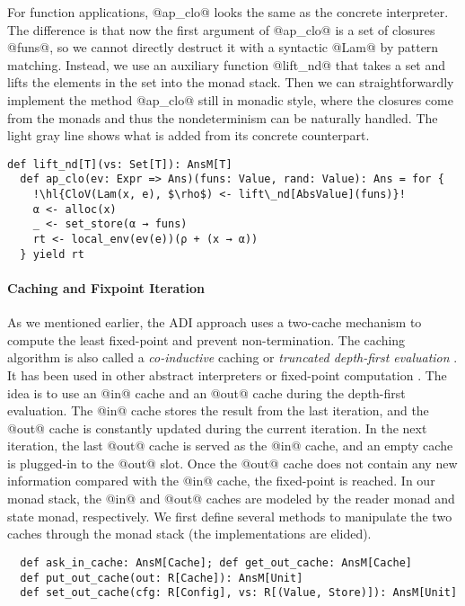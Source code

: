 For function applications, @ap_clo@ looks the same as the concrete interpreter.
The difference is that now the first argument of @ap_clo@ is a set of closures
@funs@, so we cannot directly destruct it with a syntactic @Lam@ by pattern
matching. Instead, we use an auxiliary function @lift_nd@ that takes a set and
lifts the elements in the set into the monad stack. Then we can
straightforwardly implement the method @ap_clo@ still in monadic style, where the
closures come from the monads and thus the nondeterminism can be naturally
handled. The light gray line shows what is added from its concrete counterpart.
\begin{lstlisting}[escapechar=!]
  def lift_nd[T](vs: Set[T]): AnsM[T]
  def ap_clo(ev: Expr => Ans)(funs: Value, rand: Value): Ans = for {
    !\hl{CloV(Lam(x, e), $\rho$) <- lift\_nd[AbsValue](funs)}!
    α <- alloc(x)
    _ <- set_store(α → funs)
    rt <- local_env(ev(e))(ρ + (x → α))
  } yield rt
\end{lstlisting}

\paragraph{Caching and Fixpoint Iteration}
As we mentioned earlier, the ADI approach uses a two-cache mechanism to
compute the least fixed-point and prevent non-termination.
The caching algorithm is also called a \textit{co-inductive} caching or
\textit{truncated depth-first evaluation} \cite{Rosendahl:AbsIntPL}. It has
been used in other abstract interpreters or fixed-point computation
\cite{DBLP:journals/pacmpl/DaraisLNH17, Wei:2018:RAA:3243631.3236800,
  Rosendahl:AbsIntPL}. The idea is to use an @in@ cache and an @out@ cache during
the depth-first evaluation. The @in@ cache stores the result from the last
iteration, and the @out@ cache is constantly updated during the current iteration. In
the next iteration, the last @out@ cache is served as the @in@ cache, and
an empty cache is plugged-in to the @out@ slot. Once the @out@ cache does not
contain any new information compared with the @in@ cache, the fixed-point is
reached.
In our monad stack, the @in@ and @out@ caches are modeled by the reader monad and
state monad, respectively. We first define several methods to manipulate
the two caches through the monad stack (the implementations are elided).
\begin{lstlisting}
  def ask_in_cache: AnsM[Cache]; def get_out_cache: AnsM[Cache]
  def put_out_cache(out: R[Cache]): AnsM[Unit]
  def set_out_cache(cfg: R[Config], vs: R[(Value, Store)]): AnsM[Unit]
\end{lstlisting}

